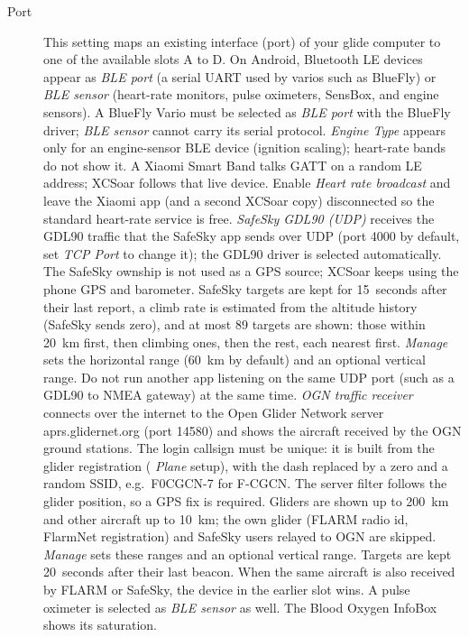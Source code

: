 \begin{description}
\item[Port]  This setting maps an existing interface (port) of your 
  glide computer to one of the available slots A to D.
  On Android, Bluetooth LE devices appear as {\it BLE port} (a
  serial UART used by varios such as BlueFly) or {\it BLE sensor}
  (heart-rate monitors, pulse oximeters, SensBox, and engine sensors).
  A BlueFly Vario must be selected as {\it BLE port} with the BlueFly
  driver; {\it BLE sensor} cannot carry its serial protocol.
  {\it Engine Type} appears only for an engine-sensor BLE device
  (ignition scaling); heart-rate bands do not show it.
  A Xiaomi Smart Band talks GATT on a random LE address; XCSoar
  follows that live device.  Enable {\it Heart rate broadcast} and
  leave the Xiaomi app (and a second XCSoar copy) disconnected so the
  standard heart-rate service is free.
  {\it SafeSky GDL90 (UDP)} receives the GDL90 traffic that the
  SafeSky app sends over UDP (port 4000 by default, set {\it TCP Port}
  to change it); the GDL90 driver is selected automatically.  The
  SafeSky ownship is not used as a GPS source; XCSoar keeps using the
  phone GPS and barometer.  SafeSky targets are kept for 15~seconds
  after their last report, a climb rate is estimated from the
  altitude history (SafeSky sends zero), and at most 89 targets are
  shown: those within 20~km first, then climbing ones, then the
  rest, each nearest first.  {\it Manage} sets the horizontal range
  (60~km by default) and an optional vertical range.  Do not run
  another app listening on the same UDP port (such as a GDL90 to NMEA
  gateway) at the same time.
  {\it OGN traffic receiver} connects over the internet to the Open
  Glider Network server aprs.glidernet.org (port 14580) and shows the
  aircraft received by the OGN ground stations.  The login callsign
  must be unique: it is built from the glider registration ({\it
  Plane} setup), with the dash replaced by a zero and a random SSID,
  e.g.\ F0CGCN-7 for F-CGCN.  The server filter follows the glider
  position, so a GPS fix is required.  Gliders are shown up to 200~km
  and other aircraft up to 10~km; the own glider (FLARM radio id,
  FlarmNet registration) and SafeSky users relayed to OGN are
  skipped.  {\it Manage} sets these ranges and an optional vertical
  range.  Targets are kept 20~seconds after their last beacon.  When
  the same aircraft is also received by FLARM or SafeSky, the device
  in the earlier slot wins.
  A pulse oximeter is selected as {\it BLE sensor} as well.  The
  Blood Oxygen InfoBox shows its saturation.

\end{description}
